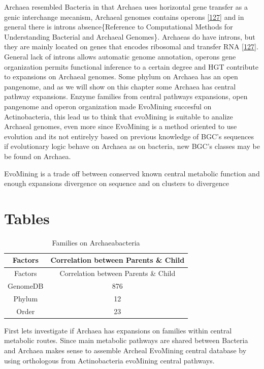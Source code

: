 \documentclass[12pt,twoside]{reedthesis}
\begin{document}
  Archaea resembled Bacteria in that Archaea uses horizontal gene transfer
  as a genic interchange mecanism, Archaeal genomes contains operons
  {[}\protect\hyperlink{ref-howland_surprising_2000}{127}{]} and in
  general there is introns absence\{Reference to Computational Methods for
  Understanding Bacterial and Archaeal Genomes\}. Archaeas do have
  introns, but they are mainly located on genes that encodes ribosomal and
  transfer RNA {[}\protect\hyperlink{ref-howland_surprising_2000}{127}{]}.
  General lack of introns allows automatic genome annotation, operons gene
  organization permits functional inference to a certain degree and HGT
  contribute to expansions on Archaeal genomes. Some phylum on Archaea has
  an open pangenome, and as we will show on this chapter some Archaea has
  central pathway expansions. Enzyme families from central pathways
  expansions, open pangenome and operon organization made EvoMining
  succesful on Actinobacteria, this lead us to think that evoMining is
  suitable to analize Archaeal genomes, even more since EvoMining is a
  method oriented to use evolution and its not entirelyy based on previous
  knowledge of BGC's sequences if evolutionary logic behave on Archaea as
  on bacteria, new BGC's classes may be be found on Archaea.
  
  EvoMining is a trade off between conserved known central metabolic
  function and enough expansions divergence on sequence and on clusters to
  divergence
  
  \section{Tables}\label{tables}
  
  \begin{longtable}[]{@{}cc@{}}
  \caption{Families on Archaeabacteria \label{tab:inher}}\tabularnewline
  \toprule
  Factors & Correlation between Parents \& Child\tabularnewline
  \midrule
  \endfirsthead
  \toprule
  Factors & Correlation between Parents \& Child\tabularnewline
  \midrule
  \endhead
  GenomeDB & 876\tabularnewline
  Phylum & 12\tabularnewline
  Order & 23\tabularnewline
  \bottomrule
  \end{longtable}
  
  \clearpage
  
  First lets investigate if Archaea has expansions on families within
  central metabolic routes. Since main metabolic pathways are shared
  between Bacteria and Archaea makes sense to assemble Archeal EvoMining
  central database by using orthologous from Actinobacteria evoMining
  central pathways.
  
\end{document}
